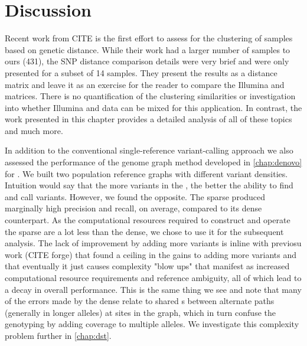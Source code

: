 
\section{Discussion}


Recent work from CITE \etal{} is the first effort to assess \ont{} for the clustering of samples based on genetic distance. While their work had a larger number of samples to ours (431), the SNP distance comparison details were very brief and were only presented for a subset of 14 samples. They present the results as a distance matrix and leave it as an exercise for the reader to compare the Illumina and \ont{} matrices. There is no quantification of the clustering similarities or investigation into whether Illumina and \ont{} data can be mixed for this application. In contrast, the work presented in this chapter provides a detailed analysis of all of these topics and much more.

In addition to the conventional single-reference variant-calling approach we also assessed the performance of the genome graph method developed in \autoref{chap:denovo} for \mtb{}. We built two \mtb{} population reference graphs with different variant densities. Intuition would say that the more variants in the \prg{}, the better the ability to find and call variants. However, we found the opposite. The sparse \prg{} produced marginally high precision and recall, on average, compared to its dense counterpart. As the computational resources required to construct and operate the sparse \prg{} are a lot less than the dense, we chose to use it for the subsequent analysis. The lack of improvement by adding more variants is inline with previosu work (CITE forge) that found a ceiling in the gains to adding more variants and that eventually it just causes complexity "blow ups" that manifest as increased computational resource requirements and reference ambiguity, all of which lead to a decay in overall performance. This is the same thing we see and note that many of the errors made by the dense \prg{} relate to shared \kmer{}s between alternate paths (generally in longer alleles) at sites in the graph, which in turn confuse the genotyping by adding coverage to multiple alleles. We investigate this complexity problem further in \autoref{chap:dst}.

